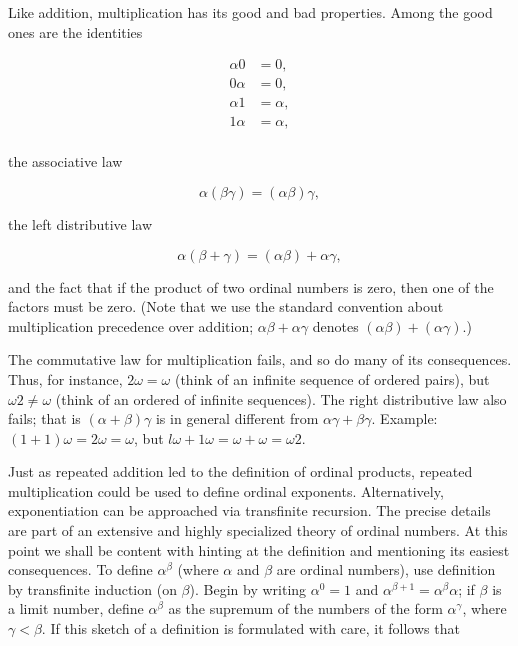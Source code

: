 Like addition, multiplication has its good and bad properties.   Among the good ones are the identities 

\begin{align*}
\alpha 0 &= 0,\\
0 \alpha &= 0,\\
\alpha 1 &= \alpha ,\\
1 \alpha &= \alpha ,\\
\end{align*}

the associative law 

\begin{equation*}
\alpha ( \beta \gamma) = ( \alpha \beta ) \gamma , 
\end{equation*}

the left distributive law

\begin{equation*}
\alpha ( \beta  +\gamma) = ( \alpha \beta ) + \alpha \gamma , 
\end{equation*}

and the fact that if the product of two ordinal numbers is zero, then one of the factors must be zero. (Note that we use the standard convention about multiplication precedence over addition; $\alpha \beta + \alpha \gamma$ denotes $(\alpha \beta) + (\alpha \gamma)$.) 

The commutative law for multiplication fails, and so do many of its consequences. Thus, for instance, $2 \omega = \omega$ (think of an infinite sequence of ordered pairs), but $\omega 2 \neq \omega$ (think of an ordered of infinite sequences). The right distributive law also fails; that is $(\alpha + \beta) \gamma$ is in general different from $\alpha \gamma + \beta \gamma$. Example: $(1 + 1) \omega = 2 \omega = \omega$, but $l \omega + 1 \omega = \omega + \omega = \omega 2$. 

Just as repeated addition led to the definition of ordinal products, repeated multiplication could be used to define ordinal exponents. Alternatively, exponentiation can be approached via transfinite recursion. The precise details are part of an extensive and highly specialized theory of ordinal numbers. At this point we shall be content with hinting at the definition and mentioning its easiest consequences. To define $\alpha^{\beta}$ (where $\alpha$ and $\beta$ are ordinal numbers), use definition by transfinite induction (on $\beta$). Begin by writing $\alpha^{0} = 1$ and $\alpha^{\beta + 1} = \alpha^{\beta} \alpha$; if $\beta$ is a limit number, define $\alpha^{\beta}$ as the supremum of the numbers of the form $\alpha^{\gamma}$, where $\gamma < \beta$. If this sketch of a definition is formulated with care, it follows that

